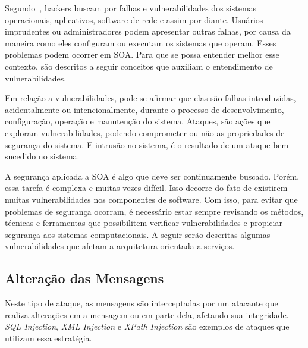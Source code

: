Segundo~\cite{Verissimo2001}, hackers buscam por falhas e vulnerabilidades dos sistemas operacionais, aplicativos, software de rede e assim por diante. Usuários imprudentes ou administradores podem apresentar outras falhas, por causa da maneira como eles configuram ou executam os sistemas que operam. Esses problemas podem ocorrer em SOA. Para que se possa entender melhor esse contexto, são descritos a seguir conceitos que auxiliam o entendimento de vulnerabilidades.

Em relação a vulnerabilidades, pode-se afirmar que elas são falhas introduzidas, acidentalmente ou intencionalmente, durante o processo de desenvolvimento, configuração, operação e manutenção do sistema. Ataques, são ações que exploram vulnerabilidades, podendo comprometer ou não as propriedades de segurança do sistema. E intrusão no sistema, é o resultado de um ataque bem sucedido no sistema.





A segurança aplicada a SOA é algo que deve ser continuamente buscado. Porém, essa tarefa é complexa e muitas vezes difícil. Isso decorre do fato de existirem muitas vulnerabilidades nos componentes de software. Com isso, para evitar que problemas de segurança ocorram, é necessário estar sempre revisando os métodos, técnicas e ferramentas que possibilitem verificar vulnerabilidades e propiciar segurança aos sistemas computacionais. A seguir serão descritas algumas vulnerabilidades que afetam a arquitetura orientada a serviços.

\subsection{Alteração das Mensagens}

Neste tipo de ataque, as mensagens são interceptadas por um atacante que realiza alterações em a mensagem ou em parte dela, afetando sua integridade. \emph{SQL Injection}, \emph{XML Injection} e \emph{XPath Injection} são exemplos de ataques que utilizam essa estratégia.


